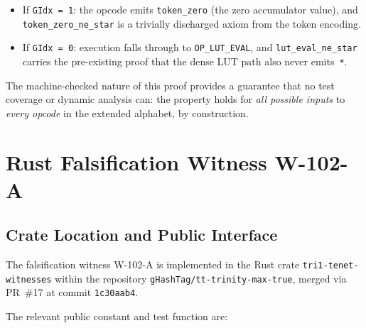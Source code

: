 \begin{itemize}
  \item If \texttt{GIdx = 1}: the opcode emits \texttt{token\_zero}
        (the zero accumulator value), and \texttt{token\_zero\_ne\_star}
        is a trivially discharged axiom from the token encoding.
  \item If \texttt{GIdx = 0}: execution falls through to
        \texttt{OP\_LUT\_EVAL}, and \texttt{lut\_eval\_ne\_star} carries
        the pre-existing proof that the dense LUT path also never
        emits~\texttt{*}.
\end{itemize}

The machine-checked nature of this proof provides a guarantee that
no test coverage or dynamic analysis can: the property holds for
\emph{all possible inputs} to \emph{every opcode} in the extended
alphabet, by construction.

\section{Rust Falsification Witness W-102-A}
\label{sec:ch79-witness}

\subsection{Crate Location and Public Interface}
\label{subsec:ch79-witness-location}

The falsification witness W-102-A is implemented in the Rust crate
\texttt{tri1-tenet-witnesses} within the repository
\texttt{gHashTag/tt-trinity-max-true}, merged via PR~\#17 at commit
\texttt{1c30aab4}.

The relevant public constant and test function are:

